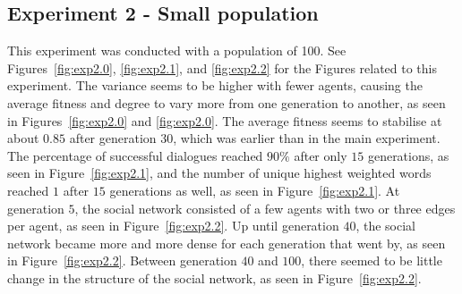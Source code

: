 \clearpage
\subsection{Experiment 2 - Small population}
This experiment was conducted with a population of 100. See Figures~\ref{fig:exp2.0}, \ref{fig:exp2.1}, and \ref{fig:exp2.2} for the Figures related to this experiment. The variance seems to be higher with fewer agents, causing the average fitness and degree to vary more from one generation to another, as seen in Figures~\ref{fig:exp2.0} and \ref{fig:exp2.0}. The average fitness seems to stabilise at about $0.85$ after generation $30$, which was earlier than in the main experiment. The percentage of successful dialogues reached $90\%$ after only $15$ generations, as seen in Figure~\ref{fig:exp2.1}, and the number of unique highest weighted words reached $1$ after $15$ generations as well, as seen in Figure~\ref{fig:exp2.1}. At generation $5$, the social network consisted of a few agents with two or three edges per agent, as seen in Figure~\ref{fig:exp2.2}. Up until generation $40$, the social network became more and more dense for each generation that went by, as seen in Figure~\ref{fig:exp2.2}. Between generation $40$ and $100$, there seemed to be little change in the structure of the social network, as seen in Figure~\ref{fig:exp2.2}.

